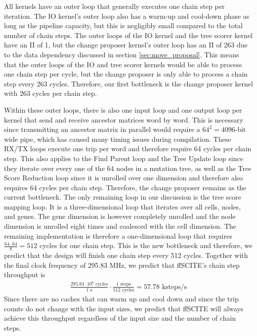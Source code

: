 All kernels have an outer loop that generally executes one chain step per iteration. The IO kernel's outer loop also has a warm-up and cool-down phase as long as the pipeline capacity, but this is negligibly small compared to the total number of chain steps. The outer loops of the IO kernel and the tree scorer kernel have an \ac{II} of 1, but the change proposer kernel's outer loop has an \ac{II} of 263 due to the data dependency discussed in section \ref{sec:move_proposal}. This means that the outer loops of the IO and tree scorer kernels would be able to process one chain step per cycle, but the change proposer is only able to process a chain step every 263 cycles. Therefore, our first bottleneck is the change proposer kernel with 263 cycles per chain step.

Within these outer loops, there is also one input loop and one output loop per kernel that send and receive ancestor matrices word by word. This is necessary since transmitting an ancestor matrix in parallel would require a $64^2 = 4096$-bit wide pipe, which has caused many timing issues during compilation. These RX/TX loops execute one trip per word and therefore require 64 cycles per chain step. This also applies to the Find Parent loop and the Tree Update loop since they iterate over every one of the 64 nodes in a mutation tree, as well as the Tree Score Reduction loop since it is unrolled over one dimension and therefore also requires 64 cycles per chain step. Therefore, the change proposer remains as the current bottleneck. The only remaining loop in our discussion is the tree score mapping loop. It is a three-dimensional loop that iterates over all cells, nodes, and genes. The gene dimension is however completely unrolled and the node dimension is unrolled eight times and coalesced with the cell dimension. The remaining implementation is therefore a one-dimensional loop that requires $\frac{64 \cdot 64}{8} = 512$ cycles for one chain step. This is the new bottleneck and therefore, we predict that the design will finish one chain step every 512 cycles. Together with the final clock frequency of 295.83 MHz, we predict that \ac{ffSCITE}'s chain step throughput is
\begin{align*}
    \frac{295.83 \cdot 10^6 \text{ cycles}}{1 \text{ s}} \cdot \frac{1 \text{ steps}}{512 \text{ cycles}} = 57.78 \text{ ksteps/s} 
\end{align*}
Since there are no caches that can warm up and cool down and since the trip counts do not change with the input sizes, we predict that \ac{ffSCITE} will always achieve this throughput regardless of the input size and the number of chain steps.